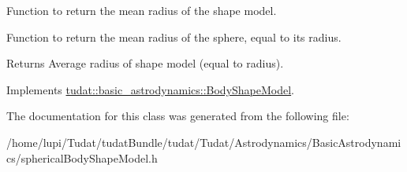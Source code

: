 Function to return the mean radius of the shape model. 

Function to return the mean radius of the sphere, equal to its radius. \begin{DoxyReturn}{Returns}
Average radius of shape model (equal to radius). 
\end{DoxyReturn}


Implements \hyperlink{classtudat_1_1basic__astrodynamics_1_1BodyShapeModel_a36f348a51efc73a5414d55438d4347eb}{tudat\+::basic\+\_\+astrodynamics\+::\+Body\+Shape\+Model}.



The documentation for this class was generated from the following file\+:\begin{DoxyCompactItemize}
\item 
/home/lupi/\+Tudat/tudat\+Bundle/tudat/\+Tudat/\+Astrodynamics/\+Basic\+Astrodynamics/spherical\+Body\+Shape\+Model.\+h\end{DoxyCompactItemize}
